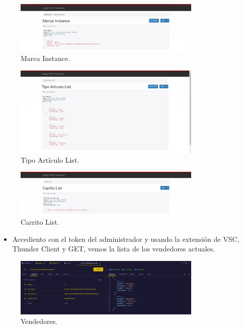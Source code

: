 \documentclass{article}
\begin{document}
    \begin{figure}[H]
		\centering
        \includegraphics[width=0.8\textwidth,keepaspectratio]{img/b5.jpeg}
		\caption{Marca Instance.}
    \end{figure}
    \begin{figure}[H]
		\centering
        \includegraphics[width=0.8\textwidth,keepaspectratio]{img/b6.jpeg}
		\caption{Tipo Artículo List.}
    \end{figure}
    \begin{figure}[H]
		\centering
        \includegraphics[width=0.8\textwidth,keepaspectratio]{img/b7.jpeg}
		\caption{Carrito List.}
    \end{figure}
    \begin{itemize}
        \item Accediento con el token del administrador y usando la extensión de VSC, Thunder Client y GET, vemos la lista de los vendedores actuales. 
    \end{itemize}
    \begin{figure}[H]
		\centering
        \includegraphics[width=0.8\textwidth,keepaspectratio]{img/b8.jpeg}
		\caption{Vendedores.}
    \end{figure}
\end{document}
